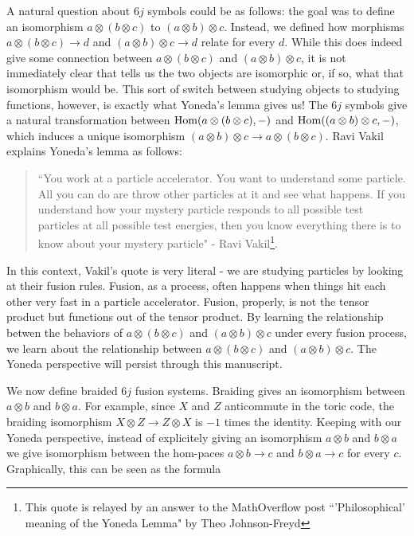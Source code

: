 \documentclass{article}
\theoremstyle{definition}
\numberwithin{figure}{section}
\begin{document}
A natural question about $6j$ symbols could be as follows: the goal was to define an isomorphism $a\otimes (b\otimes c)$ to $(a\otimes b)\otimes c$. Instead, we defined how morphisms $a\otimes (b\otimes c)\to d$
 and $(a\otimes b)\otimes c\to d$ relate for every $d$. While this does indeed give some connection between $a\otimes (b\otimes c)$ and $(a\otimes b)\otimes c$, it is not immediately clear that tells us the two objects are isomorphic or, if so, what that isomorphism would be. This sort of switch between studying objects to studying functions, however, is exactly what Yoneda's lemma gives us! The $6j$ symbols give a natural transformation between $\mathrm{Hom}(a\otimes (b\otimes c),\--)$ and $\mathrm{Hom}((a\otimes b)\otimes c,\--)$, which induces a unique isomorphism $(a\otimes b)\otimes c\to a\otimes (b\otimes c)$. Ravi Vakil explains Yoneda's lemma as follows:

\begin{quote}
``You work at a particle accelerator. You want to understand some particle. All you can do are throw other particles at it and see what happens. If you understand how your mystery particle responds to all possible test particles at all possible test energies, then you know everything there is to know about your mystery particle" - Ravi Vakil\footnote{This quote is relayed by an answer to the MathOverflow post ``'Philosophical' meaning of the Yoneda Lemma" by Theo Johnson-Freyd}.
\end{quote}

In this context, Vakil's quote is very literal - we are studying particles by looking at their fusion rules. Fusion, as a process, often happens when things hit each other very fast in a particle accelerator. Fusion, properly, is not the tensor product but functions out of the tensor product. By learning the relationship betwen the behaviors of $a\otimes (b\otimes c)$ and $(a\otimes b)\otimes c$ under every fusion process, we learn about the relationship between $a\otimes (b\otimes c)$ and $(a\otimes b)\otimes c$. The Yoneda perspective will persist through this manuscript.

We now define braided $6j$ fusion systems. Braiding gives an isomorphism between $a\otimes b$ and $b\otimes a$. For example, since $X$ and $Z$ anticommute in the toric code, the braiding isomorphism $X\otimes Z\to Z\otimes X$ is $-1$ times the identity. Keeping with our Yoneda perspective, instead of explicitely giving an isomorphism $a\otimes b$ and $b\otimes a$ we give isomorphism between the hom-paces $a\otimes b\to c$ and $b\otimes a\to c$ for every $c$. Graphically, this can be seen as the formula
\end{document}
